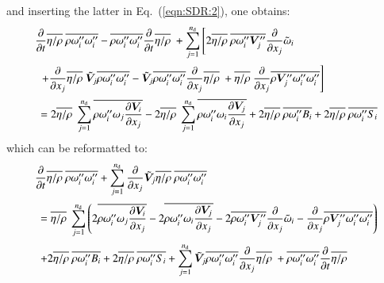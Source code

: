 \documentclass{warpdoc}
\newcommand{\alb}{\vspace{0.2cm}\\} %
\newcommand{\nd}{{{n}_{\rm d}}}
\newcommand{\mfd}{\displaystyle}
\begin{document}
%
and inserting the latter in Eq.\ (\ref{eqn:SDR:2}), one obtains:
%
\begin{equation}
 \begin{array}{l}
         \mfd \frac{\partial }{\partial t} \overline{\eta/\rho}~ \overline{\rho \omega_i^{\prime\prime} \omega_i^{\prime\prime} }
        - \overline{\rho \omega_i^{\prime\prime} \omega_i^{\prime\prime}}\frac{\partial }{\partial t} \overline{\eta/\rho}~
        +\mfd\sum_{j=1}^{\nd}
         \mfd\left[
           2 \overline{\eta/\rho}~ \overline{\rho \omega_i^{\prime\prime} \bm{V}_j^{\prime\prime}}
           \frac{\partial }{\partial x_j} {\wtilde{\omega}_i}
         \right.\alb~~
         \mfd\left.
            +  \frac{\partial }{\partial x_j} \overline{\eta/\rho}~ {\wtilde{\bm{V}}_j} \overline{\rho \omega_i^{\prime\prime} \omega_i^{\prime\prime}}
            -  {\wtilde{\bm{V}}_j} \overline{\rho \omega_i^{\prime\prime} \omega_i^{\prime\prime}} \frac{\partial }{\partial x_j}  \overline{\eta/\rho}~
            +   \overline{\eta/\rho}~ \frac{\partial }{\partial x_j} \overline{\rho {\bm{V}_j^{\prime\prime}} \omega_i^{\prime\prime} \omega_i^{\prime\prime}}
         \right]
    \alb~~
   =\mfd 2\overline{\eta/\rho}~ \sum_{j=1}^\nd \overline{\rho  \omega_i^{\prime\prime}  \omega_j  \frac{\partial \bm{V}_i}{\partial x_j}}
  -2\overline{\eta/\rho}~ \sum_{j=1}^\nd \overline{\rho  \omega_i^{\prime\prime}  \omega_i  \frac{\partial \bm{V}_j}{\partial x_j}}
  +2\overline{\eta/\rho}~ \overline{\rho \omega_i^{\prime\prime} B_i}
  +2\overline{\eta/\rho}~ \overline{\rho \omega_i^{\prime\prime} S_i}
 \end{array}
\label{eqn:SDR:3}
\end{equation}
%
which can be reformatted to:
%
\begin{equation}
 \begin{array}{l}
         \mfd \frac{\partial }{\partial t} \overline{\eta/\rho}~ \overline{\rho \omega_i^{\prime\prime} \omega_i^{\prime\prime} }
        +\mfd\sum_{j=1}^{\nd}
           \frac{\partial }{\partial x_j} {\wtilde{\bm{V}}_j} \overline{\eta/\rho}~ \overline{\rho \omega_i^{\prime\prime} \omega_i^{\prime\prime}}
     \alb~~=
        \overline{\eta/\rho}~ \mfd\sum_{j=1}^{\nd}
         \mfd\left(
              2 \overline{\rho  \omega_i^{\prime\prime}  \omega_j  \frac{\partial \bm{V}_i}{\partial x_j}}
            - 2 \overline{\rho  \omega_i^{\prime\prime}  \omega_i  \frac{\partial \bm{V}_j}{\partial x_j}}
            - 2 \overline{\rho \omega_i^{\prime\prime} \bm{V}_j^{\prime\prime}} \frac{\partial }{\partial x_j} {\wtilde{\omega}_i}
            - \frac{\partial }{\partial x_j} \overline{\rho {\bm{V}_j^{\prime\prime}} \omega_i^{\prime\prime} \omega_i^{\prime\prime}}
         \right) \alb~~
   + \mfd 2 \overline{\eta/\rho}~ \overline{\rho \omega_i^{\prime\prime} B_i}
   + 2 \overline{\eta/\rho}~ \overline{\rho \omega_i^{\prime\prime} S_i}
   + \sum_{j=1}^\nd{\wtilde{\bm{V}}_j} \overline{\rho \omega_i^{\prime\prime} \omega_i^{\prime\prime}} \frac{\partial }{\partial x_j}  \overline{\eta/\rho}~
   + \overline{\rho \omega_i^{\prime\prime} \omega_i^{\prime\prime}} \frac{\partial }{\partial t} \overline{\eta/\rho}~
 \end{array}
\label{eqn:SDR:4}
\end{equation}
\end{document}
